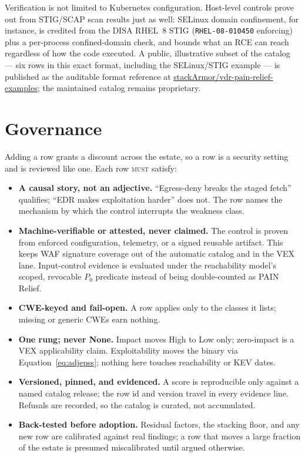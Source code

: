 \documentclass[11pt]{article}
\newcommand{\code}[1]{\texttt{#1}}
\newcommand{\rfckw}[1]{\textsc{#1}}
\begin{document}
Verification is not limited to Kubernetes configuration. Host-level controls
prove out from STIG/SCAP scan results just as well: SELinux domain confinement,
for instance, is credited from the DISA RHEL~8 STIG (\code{RHEL-08-010450}
enforcing) plus a per-process confined-domain check, and bounds what an RCE can
reach regardless of how the code executed. A public, illustrative subset of the
catalog --- six rows in this exact format, including the SELinux/STIG example ---
is published as the auditable format reference at
\href{https://github.com/stackArmor/vdr-pain-relief-examples}{stackArmor/vdr-pain-relief-examples};
the maintained catalog remains proprietary.

\section{Governance}
\label{sec:governance}
Adding a row grants a discount across the estate, so a row is a security setting
and is reviewed like one. Each row \rfckw{must} satisfy:
\begin{itemize}[leftmargin=1.5em, nosep]
\item \textbf{A causal story, not an adjective.} ``Egress-deny breaks the staged
  fetch'' qualifies; ``EDR makes exploitation harder'' does not. The row names the
  mechanism by which the control interrupts the weakness class.
\item \textbf{Machine-verifiable or attested, never claimed.} The control is
  proven from enforced configuration, telemetry, or a signed reusable artifact.
  This keeps WAF signature coverage out of the automatic catalog and in the VEX
  lane. Input-control evidence is evaluated under the reachability model's
  scoped, revocable $P_0$ predicate instead of being double-counted as PAIN
  Relief.
\item \textbf{CWE-keyed and fail-open.} A row applies only to the classes it
  lists; missing or generic CWEs earn nothing.
\item \textbf{One rung; never None.} Impact moves High to Low only; zero-impact is
  a VEX applicability claim. Exploitability moves the binary via
  Equation~\eqref{eq:adjepss}; nothing here touches reachability or KEV dates.
\item \textbf{Versioned, pinned, and evidenced.} A score is reproducible only
  against a named catalog release; the row id and version travel in every
  evidence line. Refusals are recorded, so the catalog is curated, not
  accumulated.
\item \textbf{Back-tested before adoption.} Residual factors, the stacking floor,
  and any new row are calibrated against real findings; a row that moves a large
  fraction of the estate is presumed miscalibrated until argued otherwise.
\end{itemize}
\end{document}
